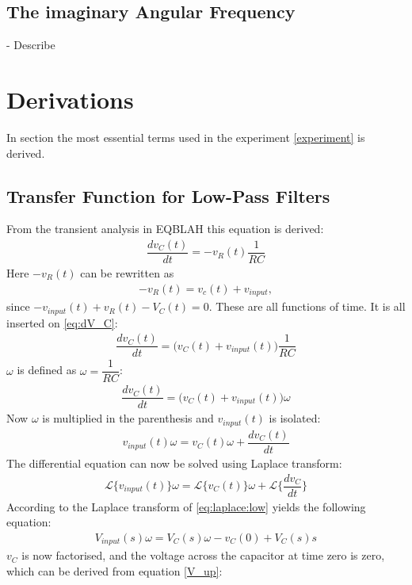\subsection{The imaginary Angular Frequency}
- Describe
\section{Derivations} \label{Derivations}
In section the most essential terms used in the experiment \ref{experiment} is derived. 
\subsection{Transfer Function for Low-Pass Filters}
From the transient analysis in EQBLAH this equation is derived:
\begin{align} \label{eq:dV_C}
\dfrac{dv_C(t)}{dt}=-v_R(t)\dfrac{1}{RC}
\end{align}
Here $-v_{R}(t)$ can be rewritten as 
\begin{align} \label{eq:vr}
-v_{R}(t) = v_{c}(t) + v_{input}, 
\end{align}
since $-v_{input}(t)+v_{R}(t)-V_{C}(t)=0$. These are all functions of time. It is all inserted on \eqref{eq:dV_C}:
\begin{align} 
\dfrac{dv_C(t)}{dt}=\Big(v_C(t) + v_{input}(t)\Big)\dfrac{1}{RC}
\end{align}
$\omega$ is defined as $\omega=\dfrac{1}{RC}$:
\begin{align}
\dfrac{dv_C(t)}{dt}=\Big(v_C(t)+v_{input}(t)\Big)\omega
\end{align}
Now $\omega$ is multiplied in the parenthesis and $v_{input}(t)$ is isolated:
\begin{align}
v_{input}(t)\omega=v_C(t)\omega+\dfrac{dv_C(t)}{dt}
\end{align}
The differential equation can now be solved using Laplace transform:
\begin{align}\label{eq:laplace:low}
\mathcal{L}\Big\{v_{input}(t)\Big\}\omega=\mathcal{L}\Big\{v_C(t)\Big\}\omega+\mathcal{L}\bigg\{\dfrac{dv_C}{dt}\bigg\}
\end{align}
According to  the Laplace transform of \eqref{eq:laplace:low} yields the following equation:
\begin{align}
V_{input}(s)\omega=V_{C}(s)\omega-v_{C}(0)+V_{C}(s)s
\end{align} 
$v_{C}$ is now factorised, and the voltage across the capacitor at time zero is zero, which can be derived from equation \eqref{V_up}:
